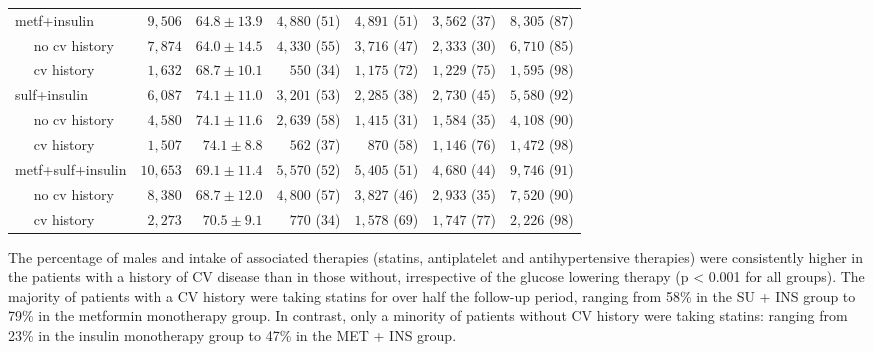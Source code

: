 {\begin{landscape}
{\begin{tabular}{lrrrrrr}
\rowcolor[gray]{.90}
metf+insulin					& $9,506$ & $64.8\pm13.9$ & $4,880$ ($51$) & $4,891$ ($51$) & $3,562$ ($37$) & $8,305$ ($87$) \\
$\quad$ no cv history 			& $7,874$ & $64.0\pm14.5$ & $4,330$ ($55$) & $3,716$ ($47$) & $2,333$ ($30$) & $6,710$ ($85$) \\
$\quad$ cv history				& $1,632$ & $68.7\pm10.1$ & $550$ ($34$) & $1,175$ ($72$) & $1,229$ ($75$) & $1,595$ ($98$) \\

\rowcolor[gray]{.90}
sulf+insulin					& $6,087$ & $74.1\pm11.0$ & $3,201$ ($53$) & $2,285$ ($38$) & $2,730$ ($45$) & $5,580$ ($92$) \\
$\quad$ no cv history			& $4,580$ & $74.1\pm11.6$ & $2,639$ ($58$) & $1,415$ ($31$) & $1,584$ ($35$) & $4,108$ ($90$) \\
$\quad$ cv history 				& $1,507$ & $74.1\pm8.8$ & $562$ ($37$) & $870$ ($58$) & $1,146$ ($76$) & $1,472$ ($98$) \\

\rowcolor[gray]{.90}
metf+sulf+insulin				& $10,653$ & $69.1\pm11.4$ & $5,570$ ($52$) & $5,405$ ($51$) & $4,680$ ($44$) & $9,746$ ($91$) \\
$\quad$ no cv history			& $8,380$ & $68.7\pm12.0$ & $4,800$ ($57$) & $3,827$ ($46$) & $2,933$ ($35$) & $7,520$ ($90$) \\
$\quad$ cv history 				& $2,273$ & $70.5\pm9.1$ & $770$ ($34$) & $1,578$ ($69$) & $1,747$ ($77$) & $2,226$ ($98$) \\
\bottomrule
\end{tabular} \label{table:survival-baseline}
}
\end{landscape}
\clearpage%
}

The percentage of males and intake of associated therapies (statins, antiplatelet and antihypertensive therapies) were consistently higher in the patients with a history of CV disease than in those without, irrespective of the glucose lowering therapy (p < 0.001 for all groups). The majority of patients with a CV history were taking statins for over half the follow-up period, ranging from 58\% in the SU + INS group to 79\% in the metformin monotherapy group. In contrast, only a minority of patients without CV history were taking statins: ranging from 23\% in the insulin monotherapy group to 47\% in the MET + INS group. 

